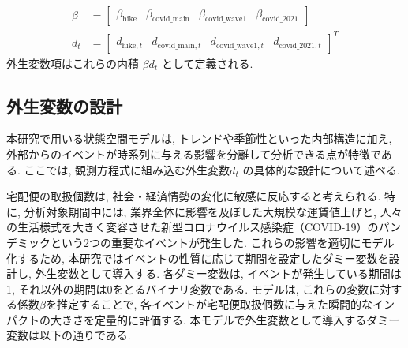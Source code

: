 \documentclass{bcsj}
\begin{document}
{
\small %
\begingroup
\setlength{\arraycolsep}{1.5pt} %
\begin{align}
    \beta &= 
    \begin{bmatrix}
        \beta_{\mathrm{hike}} & \beta_{\mathrm{covid\_main}} & \beta_{\mathrm{covid\_wave1}} & \beta_{\mathrm{covid\_2021}}
    \end{bmatrix} 
    \label{eq:beta_def} \\
    d_t &= 
    \begin{bmatrix}
        d_{\mathrm{hike}, t} & d_{\mathrm{covid\_main}, t} & d_{\mathrm{covid\_wave1}, t} & d_{\mathrm{covid\_2021}, t}
    \end{bmatrix}^T
    \label{eq:d_def}
\end{align}
\endgroup
}
外生変数項はこれらの内積 $\beta d_t$ として定義される.

\subsection{外生変数の設計}
本研究で用いる状態空間モデルは, トレンドや季節性といった内部構造に加え, 外部からのイベントが時系列に与える影響を分離して分析できる点が特徴である. 
ここでは, 観測方程式に組み込む外生変数$d_t$
 の具体的な設計について述べる. 

宅配便の取扱個数は, 社会・経済情勢の変化に敏感に反応すると考えられる. 
特に, 分析対象期間中には, 業界全体に影響を及ぼした大規模な運賃値上げと, 
人々の生活様式を大きく変容させた新型コロナウイルス感染症（COVID-19）のパンデミックという2つの重要なイベントが発生した. 
これらの影響を適切にモデル化するため, 本研究ではイベントの性質に応じて期間を設定したダミー変数を設計し, 外生変数として導入する. 
各ダミー変数は, イベントが発生している期間は1, それ以外の期間は0をとるバイナリ変数である. 
モデルは, これらの変数に対する係数$\beta$を推定することで, 各イベントが宅配便取扱個数に与えた瞬間的なインパクトの大きさを定量的に評価する. 
本モデルで外生変数として導入するダミー変数は以下の通りである. 
\end{document}
